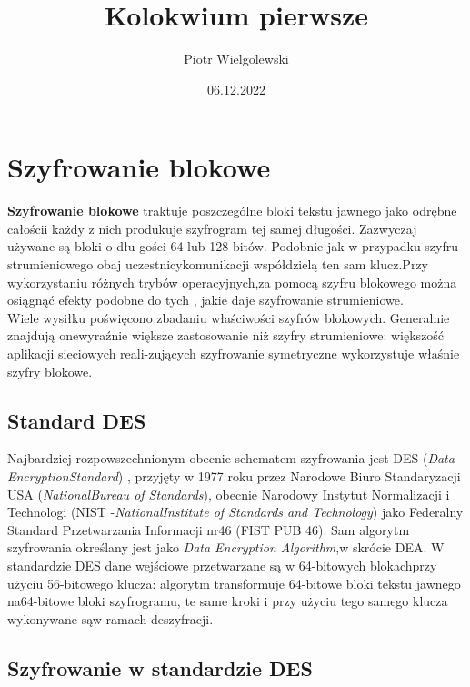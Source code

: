 \documentclass[12pt, a4paper, titlepage]{article}
\title{Kolokwium pierwsze}
\author{Piotr Wielgolewski}
\date{06.12.2022}
\begin{document}
\maketitle

\section{Szyfrowanie blokowe}


\textbf{Szyfrowanie blokowe} \cite{1} traktuje poszczególne bloki tekstu jawnego jako odrębne całościi każdy z nich produkuje szyfrogram tej samej długości. Zazwyczaj używane są bloki o dłu-gości 64 lub 128 bitów. Podobnie jak w przypadku szyfru strumieniowego obaj uczestnicykomunikacji współdzielą ten sam klucz.Przy wykorzystaniu różnych trybów operacyjnych,za pomocą szyfru blokowego można osiągnąć efekty podobne do tych , jakie daje szyfrowanie strumieniowe. \\Wiele wysiłku poświęcono zbadaniu właściwości szyfrów blokowych. Generalnie znajdują onewyraźnie większe zastosowanie niż szyfry strumieniowe: większość aplikacji sieciowych reali-zujących szyfrowanie symetryczne wykorzystuje właśnie szyfry blokowe.

\subsection{Standard DES}

Najbardziej rozpowszechnionym obecnie schematem szyfrowania jest DES (\textit{Data EncryptionStandard})  \cite{2}, przyjęty w 1977 roku przez Narodowe Biuro Standaryzacji USA (\textit{NationalBureau of Standards}), obecnie Narodowy Instytut Normalizacji i Technologi (NIST -\textit{NationalInstitute of Standards and Technology}) jako Federalny Standard Przetwarzania Informacji nr46 (FIST PUB 46). Sam algorytm szyfrowania określany jest jako \textit{Data Encryption Algorithm},w skrócie DEA. W standardzie DES dane wejściowe przetwarzane są w 64-bitowych blokachprzy użyciu 56-bitowego klucza: algorytm transformuje 64-bitowe bloki tekstu jawnego na64-bitowe bloki szyfrogramu, te same kroki i przy użyciu tego samego klucza wykonywane sąw ramach deszyfracji.

\subsection{Szyfrowanie w standardzie DES}
\end{document}
